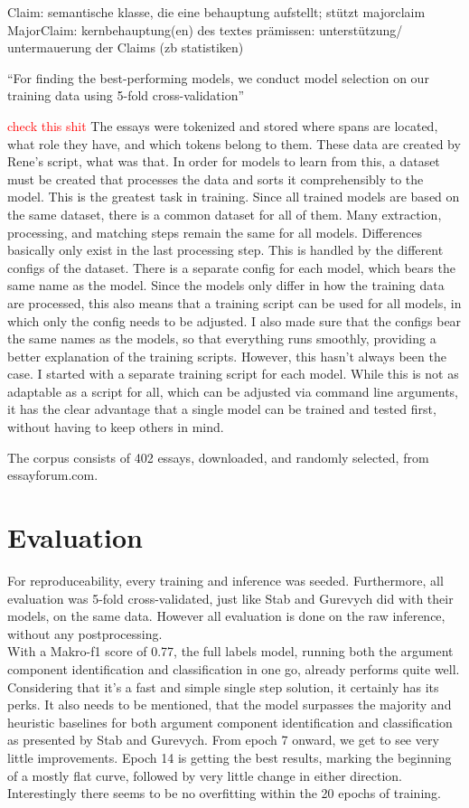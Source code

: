 \documentclass[12]{article}
\theoremstyle{mytheoremstyle}
\theoremstyle{mytheoremstyle}
\theoremstyle{myproblemstyle}
\begin{document}
  Claim: semantische klasse, die eine behauptung aufstellt; stützt majorclaim 
  MajorClaim: kernbehauptung(en) des textes 
  prämissen: unterstützung/ untermauerung der Claims (zb statistiken) 

  ``For finding the best-performing models, we conduct model selection on our training data using 5-fold cross-validation''

  \textcolor{red}{check this shit}
  The essays were tokenized and stored where spans are located, what role they have, and which tokens belong to them. These data are created by Rene's script, what was that. In order for models to learn from this, a dataset must be created that processes the data and sorts it comprehensibly to the model. This is the greatest task in training. Since all trained models are based on the same dataset, there is a common dataset for all of them. Many extraction, processing, and matching steps remain the same for all models. Differences basically only exist in the last processing step. This is handled by the different configs of the dataset. There is a separate config for each model, which bears the same name as the model. Since the models only differ in how the training data are processed, this also means that a training script can be used for all models, in which only the config needs to be adjusted. I also made sure that the configs bear the same names as the models, so that everything runs smoothly, providing a better explanation of the training scripts. However, this hasn't always been the case. I started with a separate training script for each model. While this is not as adaptable as a script for all, which can be adjusted via command line arguments, it has the clear advantage that a single model can be trained and tested first, without having to keep others in mind.

  The corpus consists of 402 essays, downloaded, and randomly selected, from essayforum.com. 
  \section{Evaluation\dotfill}
  For reproduceability, every training and inference was seeded. 
  Furthermore, all evaluation was 5-fold cross-validated, just like Stab and Gurevych did with their models, on the same data. 
  However all evaluation is done on the raw inference, without any postprocessing.\\

  With a Makro-f1 score of 0.77, the full labels model, running both the argument component identification and classification in one go, already performs quite well. 
  Considering that it's a fast and simple single step solution, it certainly has its perks. 
  It also needs to be mentioned, that the model surpasses the majority and heuristic baselines for both argument component identification and classification as presented by Stab and Gurevych.
  From epoch 7 onward, we get to see very little improvements. 
  Epoch 14 is getting the best results, marking the beginning of a mostly flat curve, followed by very little change in either direction. 
  Interestingly there seems to be no overfitting within the 20 epochs of training.
\end{document}
